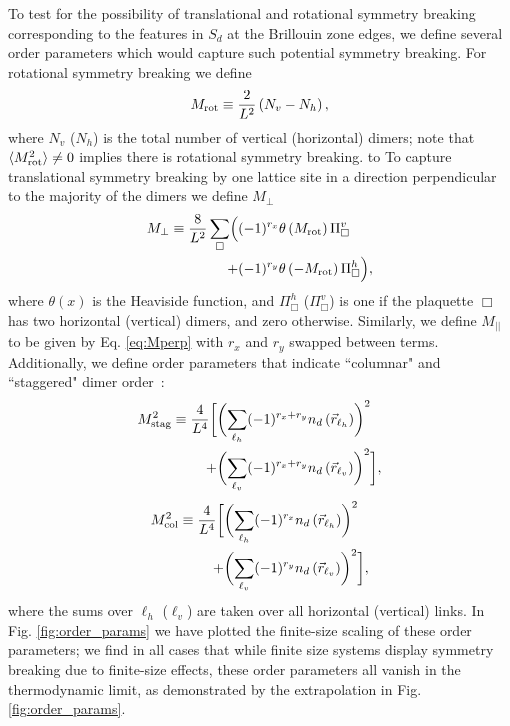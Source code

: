 \documentclass[twocolumn,prb,aps,floatfix,superscriptaddress]{revtex4-1}
\newcommand{\figref}[1]{Fig. \ref{#1}}
\newcommand{\exval}[1]{\langle #1 \rangle}
\newcommand{\Eqref}[1]{Eq. \eqref{#1}}
\newcommand{\Mrot}{M_{\rm{rot}}}
\newcommand{\Mperp}{M_\perp}
\newcommand{\Mpar}{M_{\vert\vert}}
\newcommand{\MstagSq}{M_{\rm{stag}}^2}
\newcommand{\McolSq}{M_{\rm{col}}^2}
\begin{document}
To test for the possibility of translational and rotational symmetry breaking corresponding to the features in $S_d$ at the Brillouin zone edges, we define several order parameters which would capture such potential symmetry breaking. For rotational symmetry breaking we define 
\begin{equation}
\Mrot \equiv  \frac{2}{L^2} \left(N_v - N_h\right) \label{eq:Mrot},
\end{equation}
where $N_v$ ($N_h$) is the total number of vertical (horizontal) dimers; note that $\exval{M_{\rm{rot}}^2 } \neq 0$ implies there is rotational symmetry breaking. to To capture translational symmetry breaking by one lattice site in a direction perpendicular to the majority of the dimers we define $\Mperp$ 
\begin{align}
\Mperp \equiv  \frac{8}{L^2} \sum_{\Box} \Bigl(  &(-1)^{r_x} \theta\left(\Mrot \right) \Pi_\Box^v \notag\\
+ &(-1)^{r_y}\theta\left(-\Mrot \right) \Pi_\Box^h\Bigr) \label{eq:Mperp},
\end{align}
where $\theta(x)$ is the Heaviside function, and $\Pi_\Box^h$ ($\Pi_\Box^v$) is one if the plaquette $\Box$ has two horizontal (vertical) dimers, and zero otherwise. Similarly, we define $\Mpar$ to be given by \Eqref{eq:Mperp} with $r_x$ and $r_y$ swapped between terms. Additionally, we define order parameters that indicate ``columnar" and ``staggered" dimer order~\cite{Syljuasen2005}:
\begin{align}
\MstagSq \equiv  \frac{4}{L^4} \biggl[ &\biggl( \sum_{\ell_h} (-1)^{r_x+r_y} n_d \left(\vec{r}_{\ell_h}\right) \biggr)^2  \notag\\
+&\biggl( \sum_{\ell_v} (-1)^{r_x+r_y} n_d \left(\vec{r}_{\ell_v}\right) \biggr)^2\biggr]\label{eq:Mstag},
\end{align}
\begin{align}
\McolSq \equiv  \frac{4}{L^4} \biggl[  &\biggl( \sum_{\ell_h} (-1)^{r_x} n_d \left(\vec{r}_{\ell_h}\right) \biggr)^2 \notag \\
+ &\biggl( \sum_{\ell_v} (-1)^{r_y} n_d \left(\vec{r}_{\ell_v}\right) \biggr)^2  \biggr]\label{eq:Mcol},
\end{align}
where the sums over $\ell_h$ ($\ell_v$) are taken over all horizontal (vertical) links. In \figref{fig:order_params} we have plotted the finite-size scaling of these order parameters; we find in all cases that while finite size systems display symmetry breaking due to finite-size effects, these order parameters all vanish in the thermodynamic limit, as demonstrated by the extrapolation in \figref{fig:order_params}.
\end{document}
